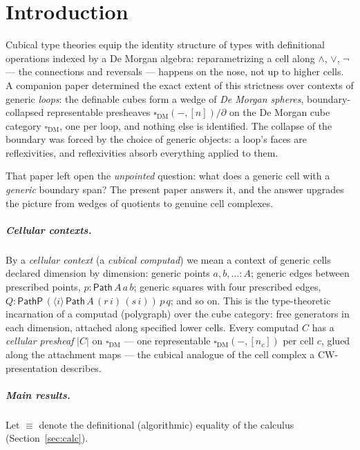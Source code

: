 \documentclass[11pt]{amsart}
\theoremstyle{definition}
\newcommand{\Dbox}{\square_{\mathrm{DM}}}
\newcommand{\aconv}{\equiv}
\newcommand{\Path}{\mathsf{Path}}
\newcommand{\PathP}{\mathsf{PathP}}
\newcommand{\Real}[1]{|#1|}
\begin{document}
\section{Introduction}
\label{sec:intro}

Cubical type theories \cite{CCHM} equip the identity structure of
types with definitional operations indexed by a De Morgan algebra:
reparametrizing a cell along $\wedge$, $\vee$, $\neg$ --- the
connections and reversals --- happens on the nose, not up to higher
cells.  A companion paper \cite{Sphere} determined the exact extent
of this strictness over contexts of generic \emph{loops}: the
definable cubes form a wedge of \emph{De Morgan spheres},
boundary-collapsed representable presheaves $\Dbox(-,[n])/\partial$
on the De Morgan cube category $\Dbox$, one per loop, and nothing
else is identified.  The collapse of the boundary was forced by the
choice of generic objects: a loop's faces are reflexivities, and
reflexivities absorb everything applied to them.

That paper left open the \emph{unpointed} question: what does a
generic cell with a \emph{generic} boundary span?  The present
paper answers it, and the answer upgrades the picture from wedges of
quotients to genuine cell complexes.

\subparagraph*{Cellular contexts.}  By a \emph{cellular context} (a
\emph{cubical computad}) we mean a context of generic cells
declared dimension by dimension: generic points $a, b, \dots : A$;
generic edges between prescribed points,
$p : \Path\,A\,a\,b$; generic squares with four prescribed edges,
$Q : \PathP\,(\langle i \rangle\, \Path\,A\,(r\,i)\,(s\,i))\,p\,q$;
and so on.  This is the type-theoretic incarnation of a computad
(polygraph) \cite{Burroni,Polygraphs} over the cube category: free
generators in each dimension, attached along specified lower cells.
Every computad $C$ has a \emph{cellular presheaf} $\Real{C}$ on
$\Dbox$ --- one representable $\Dbox(-,[n_c])$ per cell $c$, glued
along the attachment maps --- the cubical analogue of the cell
complex a CW-presentation describes.

\subparagraph*{Main results.}  Let $\aconv$ denote the definitional
(algorithmic) equality of the calculus
(Section~\ref{sec:calc}).
\end{document}
